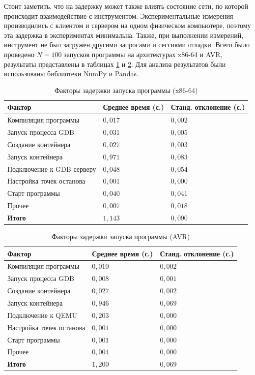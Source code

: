 \documentclass[a4paper,article,14pt]{extarticle}
\begin{document}
Стоит заметить, что на задержку может также влиять состояние сети, по которой происходит взаимодействие с инструментом. Экспериментальные измерения производились с клиентом и сервером на одном физическом компьютере, поэтому эта задержка в экспериментах минимальна. Также, при выполнении измерений, инструмент не был загружен другими запросами и сессиями отладки. Всего было проведено $N = 100$ запусков программы на архитектурах x86-64 и AVR, результаты представлены в таблицах \ref{table:startdelaymeasurements} и \ref{table:startdelaymeasurementsavr}. Для анализа результатов были использованы библиотеки NumPy\cite{numpy} и Pandas\cite{pandas}.

\begin{table}[ht]
\small
    \begin{tabular}{p{6cm}p{4.5cm}p{4.5cm}}
    \toprule
    Фактор & Среднее время (с.)  & Станд. отклонение (с.) \\
    \midrule
Компиляция программы & $0{,}017$ & $0{,}002$ \\
Запуск процесса GDB & $0{,}031$ & $0{,}005$ \\
Создание контейнера & $0{,}027$ & $0{,}003$ \\
Запуск контейнера & $0{,}971$ & $0{,}083$ \\
Подключение к GDB серверу & $0{,}048$ & $0{,}054$ \\
Настройка точек останова & $0{,}001$ & $0{,}000$ \\
Старт программы & $0{,}040$ & $0{,}041$ \\
Прочее & $0{,}007$ & $0{,}018$ \\
\textbf{Итого} & $1{,}143$ & $0{,}090$ \\
\bottomrule
    \end{tabular}
\caption{\label{table:startdelaymeasurements}Факторы задержки запуска программы (x86-64)}
\normalsize
\end{table}

\begin{table}[ht]
\small
    \begin{tabular}{p{6cm}p{4.5cm}p{4.5cm}}
    \toprule
    Фактор & Среднее время (с.)  & Станд. отклонение (с.) \\
    \midrule
Компиляция программы & $0{,}010$ & $0{,}002$ \\
Запуск процесса GDB & $0{,}008$ & $0{,}001$ \\
Создание контейнера & $0{,}027$ & $0{,}002$ \\
Запуск контейнера & $0{,}946$ & $0{,}069$ \\
Подключение к QEMU & $0{,}203$ & $0{,}000$ \\
Настройка точек останова & $0{,}001$ & $0{,}000$ \\
Старт программы & $0{,}001$ & $0{,}000$ \\
Прочее & $0{,}004$ & $0{,}000$ \\
\textbf{Итого} & $1{,}200$ & $0{,}069$ \\
\bottomrule
    \end{tabular}
\caption{\label{table:startdelaymeasurementsavr}Факторы задержки запуска программы (AVR)}
\normalsize
\end{table}
\end{document}
